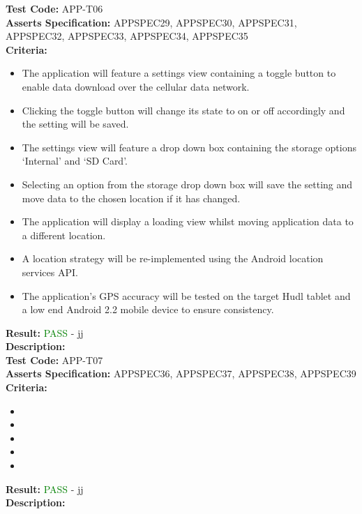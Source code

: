 \documentclass[11pt,a4paper]{report}
\begin{document}
\label{test:APP-T06}
\noindent\textbf{Test Code:} APP-T06\\
\textbf{Asserts Specification:} APPSPEC29, APPSPEC30, APPSPEC31, APPSPEC32, APPSPEC33, APPSPEC34, APPSPEC35\\ 
\textbf{Criteria:} \begin{itemize}
                     \item The application will feature a settings view containing a toggle button to enable data download over the cellular data network.
                     \item Clicking the toggle button will change its state to on or off accordingly and the setting will be saved.
                     \item The settings view will feature a drop down box containing the storage options `Internal' and `SD Card'.
                     \item Selecting an option from the storage drop down box will save the setting and move data to the chosen location if it has changed.
                     \item The application will display a loading view whilst moving application data to a different location.
                     \item A location strategy will be re-implemented using the Android location services API.
                     \item The application's GPS accuracy will be tested on the target Hudl tablet and a low end Android 2.2 mobile device to ensure consistency. 
                     \end{itemize}
                   
\textbf{Result:} \textcolor{green}{PASS} - jj\\
\textbf{Description:} \\

\label{test:APP-T07}
\noindent\textbf{Test Code:} APP-T07\\
\textbf{Asserts Specification:} APPSPEC36, APPSPEC37, APPSPEC38, APPSPEC39\\ 
\textbf{Criteria:} \begin{itemize}
                     \item  
                     \item 
                     \item
                     \item
                     \item 
                   \end{itemize}
\textbf{Result:} \textcolor{green}{PASS} - jj\\
\textbf{Description:} \\
\end{document}
